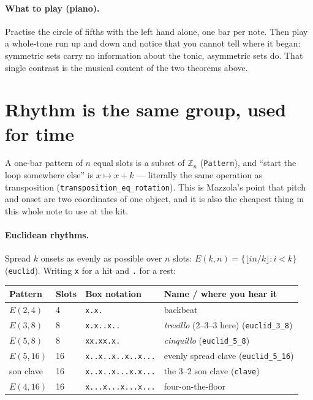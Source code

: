 \documentclass[11pt,a4paper]{article}
\newcommand{\Z}{\mathbb{Z}}
\newcommand{\lean}[1]{\texttt{#1}}
\newcommand{\boxrow}[1]{\texttt{#1}}
\begin{document}
\paragraph{What to play (piano).}
Practise the circle of fifths with the left hand alone, one bar per note.
Then play a whole-tone run up and down and notice that you cannot tell where it
began: symmetric sets carry no information about the tonic, asymmetric sets do.
That single contrast is the musical content of the two theorems above.

\section{Rhythm is the same group, used for time}

A one-bar pattern of $n$ equal slots is a subset of $\Z_n$ (\lean{Pattern}), and
``start the loop somewhere else'' is $x\mapsto x+k$ --- literally the same
operation as transposition (\lean{transposition\_eq\_rotation}). This is
Mazzola's point that pitch and onset are two coordinates of one object, and it is
also the cheapest thing in this whole note to use at the kit.

\paragraph{Euclidean rhythms.} Spread $k$ onsets as evenly as possible over $n$
slots: $E(k,n)=\{\lfloor in/k\rfloor : i<k\}$ (\lean{euclid}). Writing
\texttt{x} for a hit and \texttt{.} for a rest:

\begin{center}
\begin{tabular}{@{}llll@{}}
\toprule
Pattern & Slots & Box notation & Name / where you hear it\\
\midrule
$E(2,4)$ & 4  & \boxrow{x.x.}            & backbeat\\
$E(3,8)$ & 8  & \boxrow{x.x..x..}        & \emph{tresillo} (2--3--3 here) (\lean{euclid\_3\_8})\\
$E(5,8)$ & 8  & \boxrow{xx.xx.x.}        & \emph{cinquillo} (\lean{euclid\_5\_8})\\
$E(5,16)$& 16 & \boxrow{x..x..x..x..x...}& evenly spread clave (\lean{euclid\_5\_16})\\
son clave& 16 & \boxrow{x..x..x...x.x...}& the 3--2 son clave (\lean{clave})\\
$E(4,16)$& 16 & \boxrow{x...x...x...x...}& four-on-the-floor\\
\bottomrule
\end{tabular}
\end{center}
\end{document}
